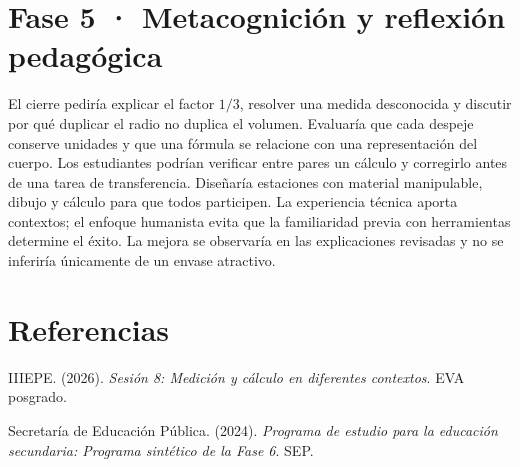 \documentclass[spanish,letterpaper,oneside]{article}
\begin{document}
\section{Fase 5 · Metacognición y reflexión pedagógica}
El cierre pediría explicar el factor $1/3$, resolver una medida desconocida y discutir por qué duplicar el radio no duplica el volumen. Evaluaría que cada despeje conserve unidades y que una fórmula se relacione con una representación del cuerpo. Los estudiantes podrían verificar entre pares un cálculo y corregirlo antes de una tarea de transferencia.
Diseñaría estaciones con material manipulable, dibujo y cálculo para que todos participen. La experiencia técnica aporta contextos; el enfoque humanista evita que la familiaridad previa con herramientas determine el éxito. La mejora se observaría en las explicaciones revisadas y no se inferiría únicamente de un envase atractivo.

\section*{Referencias}
{\setlength{\parskip}{6pt}
\par\hangindent=1.27cm  IIIEPE. (2026). \textit{Sesión 8: Medición y cálculo en diferentes contextos}. EVA posgrado.
\par\hangindent=1.27cm  Secretaría de Educación Pública. (2024). \textit{Programa de estudio para la educación secundaria: Programa sintético de la Fase 6}. SEP.
}
\end{document}
